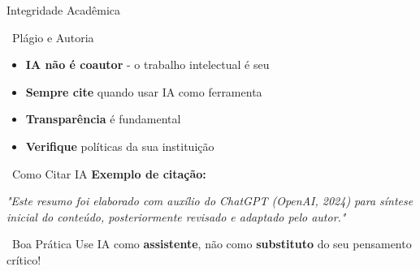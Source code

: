 \documentclass[aspectratio=169,12pt]{beamer}
\begin{document}
\begin{frame}{Integridade Acadêmica}
    \begin{alertblock}{\faExclamationTriangle\, Plágio e Autoria}
        \begin{itemize}
            \item \textbf{IA não é coautor} - o trabalho intelectual é seu
            \item \textbf{Sempre cite} quando usar IA como ferramenta
            \item \textbf{Transparência} é fundamental
            \item \textbf{Verifique} políticas da sua instituição
        \end{itemize}
    \end{alertblock}
    
    \begin{block}{\faQuoteLeft\, Como Citar IA}
        \textbf{Exemplo de citação:}
        
        \textit{"Este resumo foi elaborado com auxílio do ChatGPT (OpenAI, 2024) para síntese inicial do conteúdo, posteriormente revisado e adaptado pelo autor."}
    \end{block}
    
    \begin{exampleblock}{\faLightbulb\, Boa Prática}
        Use IA como \textbf{assistente}, não como \textbf{substituto} do seu pensamento crítico!
    \end{exampleblock}
\end{frame}
\end{document}
